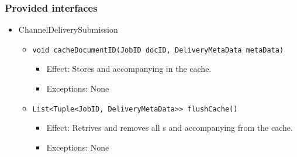 \subsubsection*{Provided interfaces}
\begin{itemize}
    \item ChannelDeliverySubmission
    \begin{itemize}
        \item \texttt{void cacheDocumentID(JobID docID, DeliveryMetaData metaData)}
        \begin{itemize}
            \item Effect: Stores  and accompanying  in the cache.
            \item Exceptions: None
        \end{itemize}

		\item \texttt{List<Tuple<JobID, DeliveryMetaData>> flushCache()}
        \begin{itemize}
            \item Effect: Retrives and removes all s and accompanying  from the cache.
            \item Exceptions: None
        \end{itemize}
    \end{itemize}
\end{itemize}